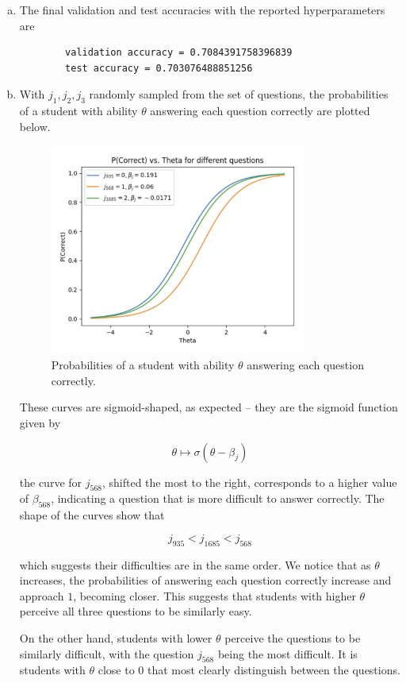 \documentclass{article}
\begin{document}
\begin{enumerate}[(a)]
    \item The final validation and test accuracies with the reported hyperparameters are
    
    \begin{verbatim}
        validation accuracy = 0.7084391758396839
        test accuracy = 0.703076488851256
    \end{verbatim}

    \item With $j_1, j_2, j_3$ randomly sampled from the set of questions, the probabilities of a student with ability $\theta$ answering each question correctly are plotted below.
    
    \begin{figure}[H]
        \centering
        \includegraphics[width=0.8\textwidth]{q2d.png}
        \caption{Probabilities of a student with ability $\theta$ answering each question correctly.}
        \label{fig:probs}
    \end{figure}

    These curves are sigmoid-shaped, as expected -- they are the sigmoid function given by 

    \[\theta \mapsto \sigma(\theta - \beta_j)\]

    the curve for $j_{568}$, shifted the most to the right, corresponds to a higher value of $\beta_{568}$, indicating a question that is more difficult to answer correctly. The shape of the curves show that

    \[j_{935} < j_{1685} < j_{568}\]

    which suggests their difficulties are in the same order. We notice that as $\theta$ increases, the probabilities of answering each question correctly increase and approach $1$, becoming closer. This suggests that students with higher $\theta$ perceive all three questions to be similarly easy. 
    
    On the other hand, students with lower $\theta$ perceive the questions to be similarly difficult, with the question $j_{568}$ being the most difficult. It is students with $\theta$ close to $0$ that most clearly distinguish between the questions.
\end{enumerate}
\end{document}
